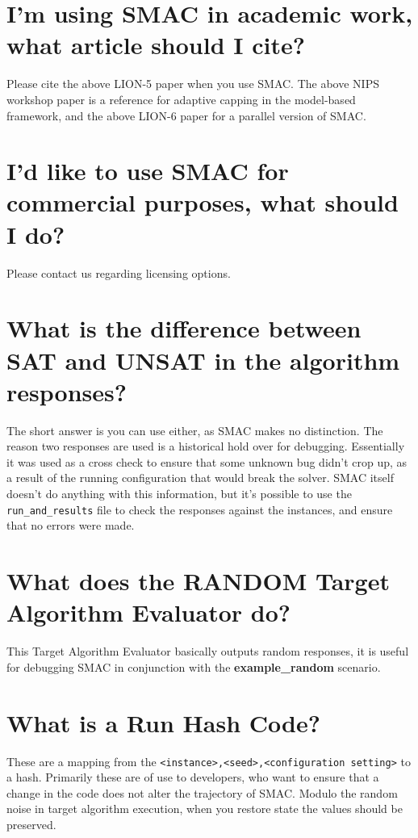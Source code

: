 \documentclass[11pt,letterpaper,oneside]{article}
\begin{document}


\section{I'm using SMAC in academic work, what article should I cite?}

Please cite the above LION-5 paper when you use SMAC.
The above NIPS workshop paper is a reference for adaptive capping in the model-based framework, and the above LION-6 paper for a parallel version of SMAC.

\section{I'd like to use SMAC for commercial purposes, what should I do?}

Please contact us regarding licensing options.

\section{What is the difference between SAT and UNSAT in the algorithm responses?}

The short answer is you can use either, as SMAC makes no distinction. The reason two responses are used is a historical hold over for debugging. Essentially it was used as a cross check to ensure that some unknown bug didn't crop up, as a result of the running configuration that would break the solver. SMAC itself doesn't do anything with this information, but it's possible to use the \texttt{run\_and\_results} file to check the responses against the instances, and ensure that no errors were made.

\section{What does the RANDOM Target Algorithm Evaluator do?}

This Target Algorithm Evaluator basically outputs random responses, it is useful for debugging SMAC in conjunction with the \textbf{example\_random} scenario.


\section{What is a Run Hash Code?}

These are a mapping from the \texttt{<instance>,<seed>,<configuration setting>} to a hash. Primarily these are of use to developers, who want to ensure that a change in the code does not alter the trajectory of SMAC. Modulo the random noise in target algorithm execution, when you restore state the values should be preserved.
\end{document}
